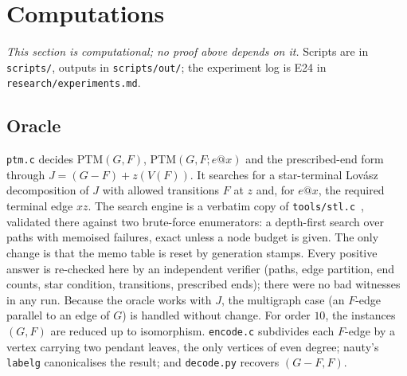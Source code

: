 \documentclass[11pt]{amsart}
\theoremstyle{definition}
\newcommand{\PTM}{\mathrm{PTM}}
\begin{document}
\section{Computations}\label{sec:comp}

\emph{This section is computational; no proof above depends on it.} Scripts are in
\texttt{scripts/}, outputs in \texttt{scripts/out/}; the experiment log is E24 in
\texttt{research/experiments.md}.

\subsection*{Oracle}
\texttt{ptm.c} decides $\PTM(G,F)$, $\PTM(G,F;e@x)$ and the prescribed-end form through
$J=(G-F)+z(V(F))$. It searches for a star-terminal Lov\'asz decomposition of $J$ with allowed
transitions $F$ at $z$ and, for $e@x$, the required terminal edge $xz$. The search engine is a
verbatim copy of \texttt{tools/stl.c}~\cite{STL}, validated there against two brute-force
enumerators: a depth-first search over paths with memoised failures, exact unless a node budget
is given. The only change is that the memo table is reset by generation stamps. Every positive
answer is re-checked here by an independent verifier (paths, edge partition, end counts, star
condition, transitions, prescribed ends); there were no bad witnesses in any run.
Because the oracle works with $J$, the multigraph case (an $F$-edge parallel to an edge of $G$) is
handled without change. For order $10$, the instances $(G,F)$ are reduced up to isomorphism.
\texttt{encode.c} subdivides each $F$-edge by a vertex carrying two pendant leaves, the only
vertices of even degree; nauty's \texttt{labelg} canonicalises the result; and \texttt{decode.py}
recovers $(G-F,F)$.
\end{document}
